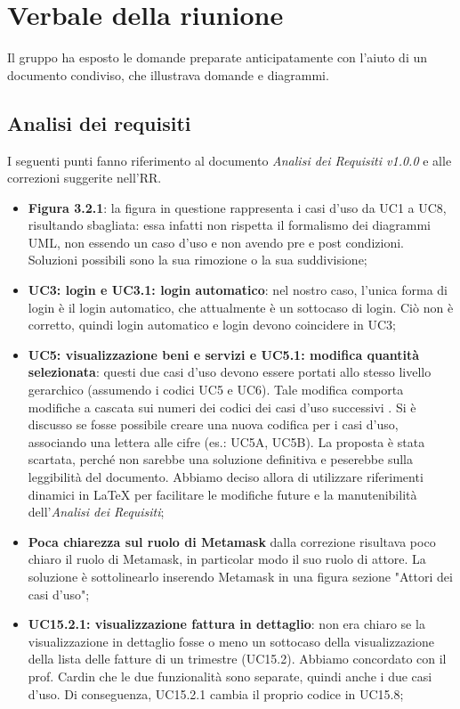 \section{Verbale della riunione}
Il gruppo ha esposto le domande preparate anticipatamente con l'aiuto di un 
documento condiviso, che illustrava domande e diagrammi.

\subsection{Analisi dei requisiti}
I seguenti punti fanno riferimento al documento \textit{Analisi dei Requisiti v1.0.0} e alle correzioni suggerite nell'RR.
\begin{itemize}
	\item \textbf{Figura 3.2.1}: la figura in questione rappresenta i casi 
	d'uso da UC1 a UC8, risultando sbagliata: essa infatti non rispetta il 
	formalismo dei diagrammi UML, non essendo un caso d'uso e non avendo pre e 
	post condizioni. Soluzioni possibili sono la sua rimozione o la sua 
	suddivisione;
	\item \textbf{UC3: login e UC3.1: login automatico}: nel nostro caso, l'unica forma di login è il login automatico, che attualmente è un sottocaso di login. Ciò non è corretto, quindi login automatico e login devono coincidere in UC3;
	\item \textbf{UC5: visualizzazione beni e servizi e UC5.1: modifica quantità selezionata}: questi due casi d'uso devono essere portati allo stesso livello gerarchico (assumendo i codici UC5 e UC6). Tale modifica comporta modifiche a cascata sui numeri dei codici dei casi d'uso successivi . Si è discusso se fosse possibile creare una nuova codifica per i casi d'uso, associando una lettera alle cifre (es.: UC5A, UC5B). La proposta è stata scartata, perché non sarebbe una soluzione definitiva e peserebbe sulla leggibilità del documento. Abbiamo deciso allora di utilizzare riferimenti dinamici in \LaTeX{} per facilitare le modifiche future e la manutenibilità dell'\textit{Analisi dei Requisiti};
	\item \textbf{Poca chiarezza sul ruolo di Metamask} dalla correzione risultava poco chiaro il ruolo di Metamask, in particolar modo il suo ruolo di attore. La soluzione è sottolinearlo inserendo Metamask in una figura sezione "Attori dei casi d'uso";
	\item \textbf{UC15.2.1: visualizzazione fattura in dettaglio}: non era chiaro se la visualizzazione in dettaglio fosse o meno un sottocaso della visualizzazione della lista delle fatture di un trimestre (UC15.2). Abbiamo concordato con il prof. Cardin che le due funzionalità sono separate, quindi anche i due casi d'uso. Di conseguenza, UC15.2.1 cambia il proprio codice in UC15.8;

\end{itemize}
